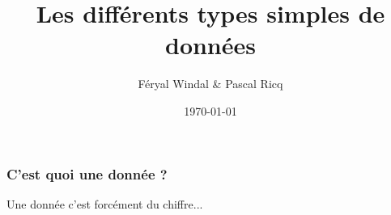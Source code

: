 \documentclass{beamer}
\title{Les différents types simples de données}
\author{Féryal Windal \& Pascal Ricq}
\date{\today}
\begin{document}
\maketitle

\begin{frame}
\frametitle{C'est quoi une donnée ? }                                                                                                                                                                                                                                                                                                                                                                                                                                                                                                                                                                                                                                                                                                                                                                                                                                                                                                                                                                                                                                                                                                                                                                                                                                                                                                                                                                                                                                                                                                                                                                                                                                                                                                                                                                                                                                                                                                                                                                                                                                                                                         Une donnée c'est forcément du chiffre...\\                                                                                                                                                                                                                                                                                                                                                                                                                                                                                                                                                                                                                                                                                                                                                                                                                                                                                                                    
\end{frame}
\end{document}
